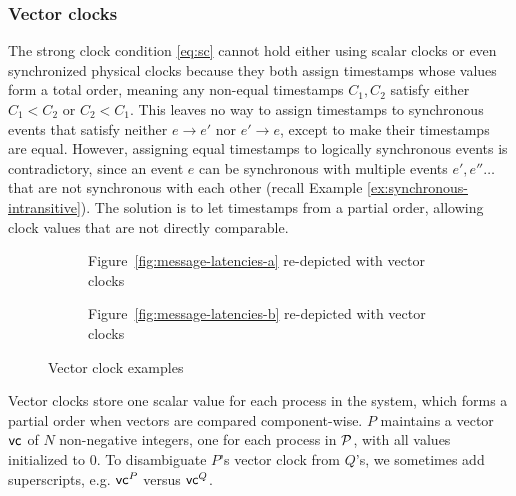 \documentclass[]             %
{NASA}                       %
\theoremstyle{definition}
\begin{document}
\subsubsection{Vector clocks}
\label{sssec:vector-clocks}
The strong clock condition \eqref{eq:sc} cannot hold either using
scalar clocks or even synchronized physical clocks because they both
assign timestamps whose values form a total order, meaning any
non-equal timestamps $C_1, C_2$ satisfy either $C_1 < C_2$ or
$C_2 < C_1$. This leaves no way to assign timestamps to synchronous
events that satisfy neither $e \to e'$ nor $e' \to e$, except to make
their timestamps are equal. However, assigning equal timestamps to
logically synchronous events is contradictory, since an event $e$ can
be synchronous with multiple events $e', e''\ldots$ that are not
synchronous with each other (recall Example
\ref{ex:synchronous-intransitive}). The solution is to let timestamps
from a partial order, allowing clock values that are not directly
comparable.


\begin{figure}
  \setlength\belowcaptionskip{5ex}

  \begin{subfigure}{1\textwidth}
    \centering
    
    \caption{Figure~\ref{fig:message-latencies-a} re-depicted with vector clocks}
    \label{fig:message-latencies-vector-a}
  \end{subfigure}

  \vspace{4ex}

  \begin{subfigure}{1\textwidth}
    \centering 
    \caption{Figure~\ref{fig:message-latencies-b} re-depicted with vector clocks}
    \label{fig:message-latencies-vector-b}
  \end{subfigure}

  \caption{Vector clock examples}
  \label{fig:message-latencies-vector}
\end{figure}
\afterpage{\clearpage}

Vector clocks store one scalar value for each process in the system,
which forms a partial order when vectors are compared
component-wise. $P$ maintains a vector $\mathsf{vc}^{}$ of $N$ non-negative
integers, one for each process in $\mathcal{P}$, with all values
initialized to $0$. To disambiguate $P$'s vector clock from $Q$'s, we
sometimes add superscripts, e.g. $\mathsf{vc}^{P}$ versus $\mathsf{vc}^{Q}$.
\end{document}
